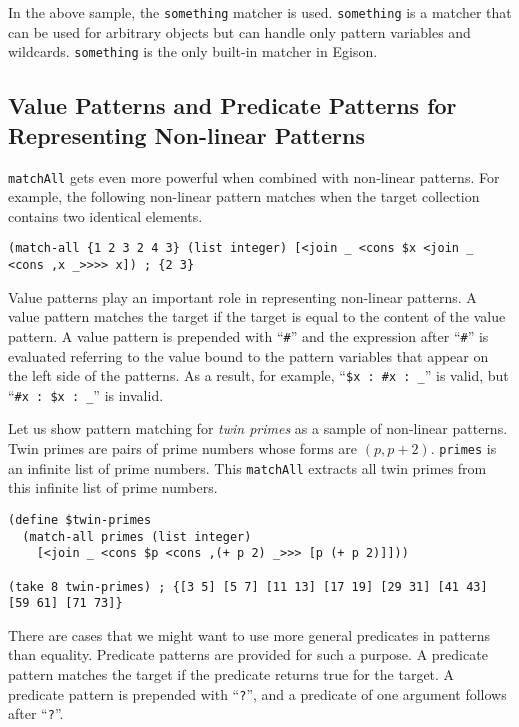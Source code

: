 \documentclass{article}
\newcommand{\todo}[1]{\textcolor{red}{(TODO: #1)}}
\begin{document}
In the above sample, the \texttt{something} matcher is used.
\texttt{something} is a matcher that can be used for arbitrary objects but can handle only pattern variables and wildcards.
\texttt{something} is the only built-in matcher in Egison.

\subsection{Value Patterns and Predicate Patterns for Representing Non-linear Patterns}\label{value-patterns}

\texttt{matchAll} gets even more powerful when combined with non-linear patterns.
For example, the following non-linear pattern matches when the target collection contains two identical elements.

\begin{lstlisting}[language=egison]
(match-all {1 2 3 2 4 3} (list integer) [<join _ <cons $x <join _ <cons ,x _>>>> x]) ; {2 3}
\end{lstlisting}

Value patterns play an important role in representing non-linear patterns.
A value pattern matches the target if the target is equal to the content of the value pattern.
A value pattern is prepended with ``\verb|#|'' and the expression after ``\verb|#|'' is evaluated referring to the value bound to the pattern variables that appear on the left side of the patterns.
As a result, for example, ``\verb|$x : #x : _|'' is valid, but ``\verb|#x : $x : _|'' is invalid.

Let us show pattern matching for \textit{twin primes} as a sample of non-linear patterns.
Twin primes are pairs of prime numbers whose forms are $(p, p+2)$.
\texttt{primes} is an infinite list of prime numbers.
This \texttt{matchAll} extracts all twin primes from this infinite list of prime numbers.


\begin{lstlisting}[language=egison]
(define $twin-primes
  (match-all primes (list integer)
    [<join _ <cons $p <cons ,(+ p 2) _>>> [p (+ p 2)]]))

(take 8 twin-primes) ; {[3 5] [5 7] [11 13] [17 19] [29 31] [41 43] [59 61] [71 73]}
\end{lstlisting}

There are cases that we might want to use more general predicates in patterns than equality.
Predicate patterns are provided for such a purpose.
A predicate pattern matches the target if the predicate returns true for the target.
A predicate pattern is prepended with ``\texttt{?}'', and a predicate of one argument follows after ``\texttt{?}''.
\end{document}
